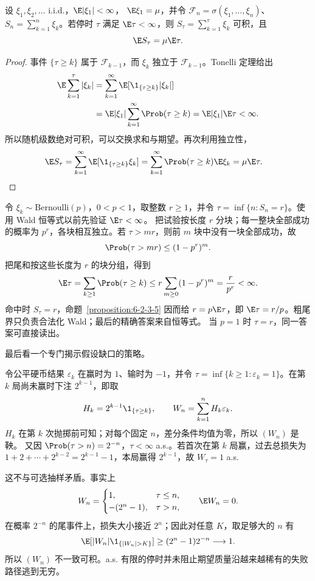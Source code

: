 \begin{proposition}\label{proposition:6-2-3-5}
设 $\xi_1,\xi_2,\ldots$ i.i.d.，$\E|\xi_1|<\infty$，
$\E\xi_1=\mu$，并令
$\mathcal F_n=\sigma(\xi_1,\ldots,\xi_n)$、
$S_n=\sum_{k=1}^n\xi_k$。若停时 $\tau$ 满足 $\E\tau<\infty$，则
$S_\tau=\sum_{k=1}^{\tau}\xi_k$ 可积，且
\[
  \E S_\tau=\mu\E\tau.
\]
\end{proposition}

\begin{proof}
事件 $\{\tau\ge k\}$ 属于 $\mathcal F_{k-1}$，而 $\xi_k$ 独立于
$\mathcal F_{k-1}$。Tonelli 定理给出
\begin{align*}
 \E\sum_{k=1}^{\tau}|\xi_k|
 &=\sum_{k=1}^\infty\E[\1_{\{\tau\ge k\}}|\xi_k|]\\
 &=\E|\xi_1|\sum_{k=1}^\infty\Prob(\tau\ge k)
 =\E|\xi_1|\E\tau<\infty.
\end{align*}
所以随机级数绝对可积，可以交换求和与期望。再次利用独立性，
\begin{align*}
 \E S_\tau
 &=\sum_{k=1}^\infty
   \E[\1_{\{\tau\ge k\}}\xi_k]
 =\sum_{k=1}^\infty \Prob(\tau\ge k)\E\xi_k
 =\mu\E\tau.
\end{align*}
\end{proof}

\begin{example}[第 $r$ 次 Bernoulli 成功]
令 $\xi_k\sim\mathrm{Bernoulli}(p)$，$0<p<1$，取整数 $r\ge1$，并令
$\tau=\inf\{n:S_n=r\}$。使用 Wald 恒等式以前先验证 $\E\tau<\infty$。
把试验按长度 $r$ 分块；每一整块全部成功的概率为 $p^r$，各块相互独立。若
$\tau>mr$，则前 $m$ 块中没有一块全部成功，故
\[
  \Prob(\tau>mr)\le(1-p^r)^m.
\]
把尾和按这些长度为 $r$ 的块分组，得到
\[
 \E\tau=\sum_{k\ge1}\Prob(\tau\ge k)
 \le r\sum_{m\ge0}(1-p^r)^m=\frac{r}{p^r}<\infty.
\]
命中时 $S_\tau=r$，命题~\ref{proposition:6-2-3-5} 因而给
$r=p\E\tau$，即 $\E\tau=r/p$。粗尾界只负责合法化 Wald；最后的精确答案来自恒等式。
当 $p=1$ 时 $\tau=r$，同一答案可直接读出。
\end{example}

最后看一个专门揭示假设缺口的策略。

\begin{example}[加倍下注策略的失效]\label{ex:6-2-3-3}
令公平硬币结果 $\varepsilon_k$ 在赢时为 $1$、输时为 $-1$，并令
$\tau=\inf\{k\ge1:\varepsilon_k=1\}$。在第 $k$ 局尚未赢时下注
$2^{k-1}$，即取
\[
 H_k=2^{k-1}\1_{\{\tau\ge k\}},
 \qquad W_n=\sum_{k=1}^nH_k\varepsilon_k.
\]
$H_k$ 在第 $k$ 次抛掷前可知；对每个固定 $n$，差分条件均值为零，所以 $(W_n)$ 是鞅。
又因 $\Prob(\tau>n)=2^{-n}$，$\tau<\infty$ a.s.。若首次在第 $k$ 局赢，过去总损失为
$1+2+\cdots+2^{k-2}=2^{k-1}-1$，本局赢得 $2^{k-1}$，故
$W_\tau=1$ a.s.

这不与可选抽样矛盾。事实上
\[
 W_n=
 \begin{cases}
 1,&\tau\le n,\\
 -(2^n-1),&\tau>n,
 \end{cases}
 \qquad \E W_n=0.
\]
在概率 $2^{-n}$ 的尾事件上，损失大小接近 $2^n$；因此对任意 $K$，取足够大的 $n$ 有
\[
 \E[|W_n|\1_{\{|W_n|>K\}}]
 \ge (2^n-1)2^{-n}\longrightarrow1.
\]
所以 $(W_n)$ 不一致可积。a.s. 有限的停时并未阻止期望质量沿越来越稀有的失败路径逃到无穷。
\end{example}

